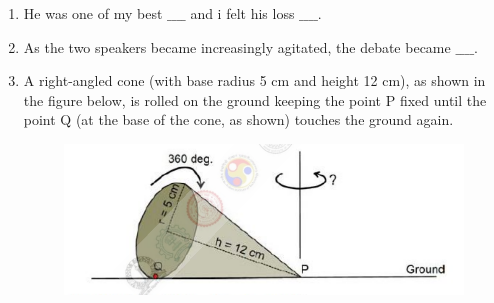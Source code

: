 \documentclass[journal]{IEEEtran}
\begin{document}
\begin{enumerate}[leftmargin=0pt]
    \item He was one of my best $\_\_\_\_$ and i felt his loss $\_\_\_\_$.
    \hfill{}
    \begin{enumerate}
    \end{enumerate}

    \item As the two speakers became increasingly agitated, the debate became $\_\_\_\_$.
    \hfill{}
    \begin{enumerate}
    \end{enumerate}

    \item A right-angled cone (with base radius 5 cm and height 12 cm), as shown in the figure below, is rolled on the ground keeping the point P fixed until the point Q (at the base of the cone, as shown) touches the ground again.
    \hfill{}
    \begin{figure}[h]
    \centering
    \includegraphics[width=0.5\columnwidth]{Figs/image (31).png}
    \caption*{}
    \label{fig:58}
    \end{figure}
    \newpage
    \begin{enumerate}
    \end{enumerate}


\end{enumerate}
\end{document}
